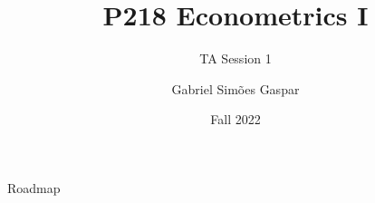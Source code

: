 \documentclass[10pt, xcolor=dvipsnames,compress]{beamer}
\title{P218 Econometrics I}
\subtitle{TA Session 1}
\author{Gabriel Simões Gaspar}
\institute{London Business School}
\date{Fall 2022}
\begin{document}
\maketitle

\begin{frame}{Roadmap}
    \tableofcontents
\end{frame}













\end{document}
